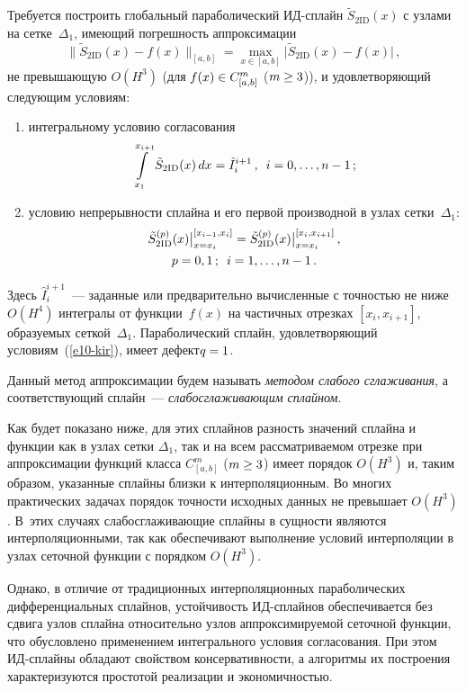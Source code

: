\begin{multicols}{2}
  Требуется построить глобальный параболический ИД-сплайн 
$\tilde{S}_{2\mathrm{ID}}(x)$ с узлами на сетке~$\Delta_1$, имеющий погрешность 
аппроксимации 
$$
\parallel \!\tilde{S}_{2\mathrm{ID}}(x)- f(x)\!\parallel_{[a,b]} = 
\max\limits_{x\in[a,b]} \vert \tilde{S}_{2\mathrm{ID}}(x)- f(x)\vert\,,
$$ 
не превышающую 
$O(H^3)$ (для $f(x)\hm\in C^m_{[a,b]}$ ($m\hm\geq 3$)), и удовлетворяющий 
следующим условиям:
  \begin{enumerate}[(1)]
\item интегральному условию согласования 
\begin{equation}
\int\limits_{x_1}^{x_{i+1}} \tilde{S}_{2\mathrm{ID}}(x)\,dx =\hat{I}_i^{i+1}\,,\enskip 
i=0,\ldots , n-1\,;
\label{e9-kir}
\end{equation}
\item условию непрерывности сплайна и его первой производной в узлах 
сетки~$\Delta_1$:
\begin{multline}
\tilde{S}_{2\mathrm{ID}}^{(p)}(x) \big\vert_{x=x_i}^{[x_{i-1},x_i]}=\tilde{S}_{2\mathrm{ID}}^{(p)} 
(x)\big\vert_{x=x_i}^{[x_i,x_{i+1}]}\,,\\  p=0,1\,; \enskip i=1,\ldots ,n-1\,.
\label{e10-kir}
\end{multline}
\end{enumerate}
Здесь $\hat{I}_i^{i+1}$~--- заданные или предварительно вы\-чис\-лен\-ные с 
точностью не ниже $O(H^4)$ интегралы от функции~$f(x)$ на частичных 
отрезках $[x_i,x_{i+1}]$, образуемых сеткой~$\Delta_1$. Параболический 
сплайн, удовлетворяющий условиям~(\ref{e10-kir}), имеет дефект\linebreak $q\hm=1$.

  Данный метод аппроксимации будем называть \textit{методом слабого 
сглаживания}, а соответствующий сплайн~--- \textit{слабосглаживающим 
сплайном}.
  
  Как будет показано ниже, для этих сплайнов разность значений сплайна и 
функции как в узлах сетки $\Delta_1$, так и на всем рассматриваемом отрезке 
при аппроксимации функций класса $C^m_{[a,b]}$ ($m\hm\geq 3$) имеет 
порядок $O(H^3)$ и, таким образом, указанные сплайны близки к 
интерполяционным. Во многих практических задачах порядок точности 
исходных данных не превышает $O(H^3)$. В~этих случаях 
слабосглаживающие сплайны в сущности являются интерполяционными, так 
как обеспечивают выполнение условий интерполяции в узлах сеточной 
функции с порядком $O(H^3)$. 
  
  Однако, в отличие от традиционных интерполяционных параболических 
дифференциальных сплайнов, устойчивость ИД-сплай\-нов обеспечивается без 
сдвига узлов сплайна относительно узлов аппроксимируемой сеточной 
функции, что обуслов\-ле\-но применением интегрального условия согласования. 
При этом ИД-сплай\-ны обладают свойством консервативности, а алгоритмы их 
по\-стро\-ения характеризуются простотой реализации и экономичностью.
  

\end{multicols}
